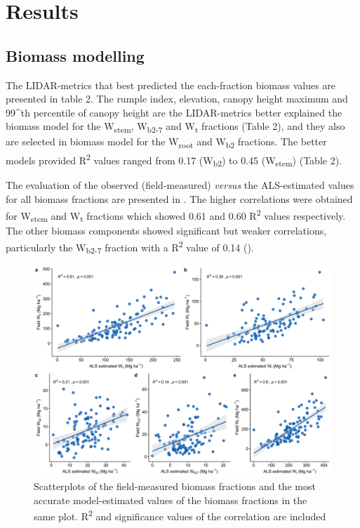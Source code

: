 \section{Results}\label{sec:carbon:results}
\subsection{Biomass modelling}\label{sec:carbon:results-modelling}

The LIDAR-metrics that best predicted the each-fraction biomass values are presented in table 2. The rumple index, elevation, canopy height maximum and 99\^{}th percentile of canopy height are the LIDAR-metrics better explained the biomass model for the W\textsubscript{stem}, W\textsubscript{b2-7} and W\textsubscript{t} fractions (Table 2), and they also are selected in biomass model for the W\textsubscript{root} and W\textsubscript{b2} fractions. The better models provided R\textsuperscript{2} values ranged from 0.17 (W\textsubscript{b2}) to 0.45 (W\textsubscript{stem}) (Table 2).

The evaluation of the observed (field-measured) \emph{versus} the ALS-estimated values for all biomass fractions are presented in . The higher correlations were obtained for W\textsubscript{stem} and W\textsubscript{t} fractions which showed 0.61 and 0.60 R\textsuperscript{2} values respectively. The other biomass components showed significant but weaker correlations, particularly the W\textsubscript{b2-7} fraction with a R\textsuperscript{2} value of 0.14 ().

\begin{figure}
    \centering
    \includegraphics[width=\textwidth]{img/carbon/carbon-compara-lidar-field.jpg}\caption{Scatterplots of the field-measured biomass fractions and the most accurate model-estimated values of the biomass fractions in the same plot. R\textsuperscript{2} and significance values of the correlation are included}\label{fig:carbon:compara}
\end{figure}


